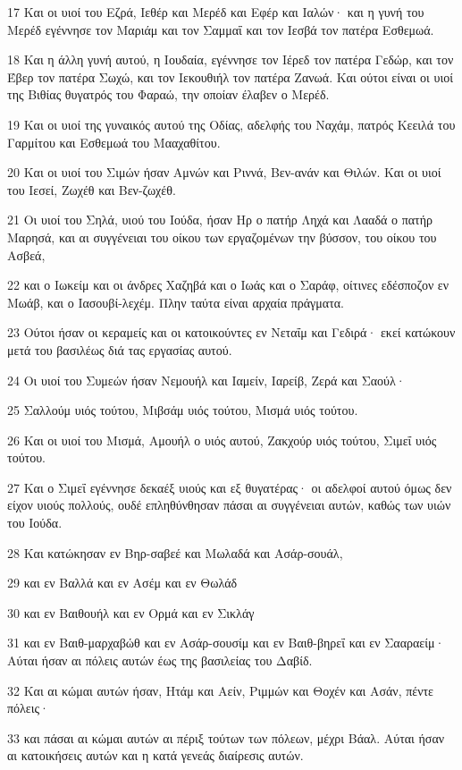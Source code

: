 \par 17 Και οι υιοί του Εζρά, Ιεθέρ και Μερέδ και Εφέρ και Ιαλών· και η γυνή του Μερέδ εγέννησε τον Μαριάμ και τον Σαμμαΐ και τον Ιεσβά τον πατέρα Εσθεμωά.
\par 18 Και η άλλη γυνή αυτού, η Ιουδαία, εγέννησε τον Ιέρεδ τον πατέρα Γεδώρ, και τον Έβερ τον πατέρα Σωχώ, και τον Ιεκουθιήλ τον πατέρα Ζανωά. Και ούτοι είναι οι υιοί της Βιθίας θυγατρός του Φαραώ, την οποίαν έλαβεν ο Μερέδ.
\par 19 Και οι υιοί της γυναικός αυτού της Οδίας, αδελφής του Ναχάμ, πατρός Κεειλά του Γαρμίτου και Εσθεμωά του Μααχαθίτου.
\par 20 Και οι υιοί του Σιμών ήσαν Αμνών και Ριννά, Βεν-ανάν και Θιλών. Και οι υιοί του Ιεσεί, Ζωχέθ και Βεν-ζωχέθ.
\par 21 Οι υιοί του Σηλά, υιού του Ιούδα, ήσαν Ηρ ο πατήρ Ληχά και Λααδά ο πατήρ Μαρησά, και αι συγγένειαι του οίκου των εργαζομένων την βύσσον, του οίκου του Ασβεά,
\par 22 και ο Ιωκείμ και οι άνδρες Χαζηβά και ο Ιωάς και ο Σαράφ, οίτινες εδέσποζον εν Μωάβ, και ο Ιασουβί-λεχέμ. Πλην ταύτα είναι αρχαία πράγματα.
\par 23 Ούτοι ήσαν οι κεραμείς και οι κατοικούντες εν Νεταΐμ και Γεδιρά· εκεί κατώκουν μετά του βασιλέως διά τας εργασίας αυτού.
\par 24 Οι υιοί του Συμεών ήσαν Νεμουήλ και Ιαμείν, Ιαρείβ, Ζερά και Σαούλ·
\par 25 Σαλλούμ υιός τούτου, Μιβσάμ υιός τούτου, Μισμά υιός τούτου.
\par 26 Και οι υιοί του Μισμά, Αμουήλ ο υιός αυτού, Ζακχούρ υιός τούτου, Σιμεΐ υιός τούτου.
\par 27 Και ο Σιμεΐ εγέννησε δεκαέξ υιούς και εξ θυγατέρας· οι αδελφοί αυτού όμως δεν είχον υιούς πολλούς, ουδέ επληθύνθησαν πάσαι αι συγγένειαι αυτών, καθώς των υιών του Ιούδα.
\par 28 Και κατώκησαν εν Βηρ-σαβεέ και Μωλαδά και Ασάρ-σουάλ,
\par 29 και εν Βαλλά και εν Ασέμ και εν Θωλάδ
\par 30 και εν Βαιθουήλ και εν Ορμά και εν Σικλάγ
\par 31 και εν Βαιθ-μαρχαβώθ και εν Ασάρ-σουσίμ και εν Βαιθ-βηρεΐ και εν Σααραείμ· Αύται ήσαν αι πόλεις αυτών έως της βασιλείας του Δαβίδ.
\par 32 Και αι κώμαι αυτών ήσαν, Ητάμ και Αείν, Ριμμών και Θοχέν και Ασάν, πέντε πόλεις·
\par 33 και πάσαι αι κώμαι αυτών αι πέριξ τούτων των πόλεων, μέχρι Βάαλ. Αύται ήσαν αι κατοικήσεις αυτών και η κατά γενεάς διαίρεσις αυτών.

